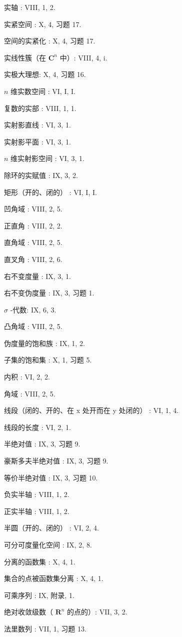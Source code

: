 实轴 : VIII, 1, 2.

实紧空间 : X, 4, 习题 17.

空间的实紧化 : X, 4, 习题 17.

实线性簇（在 \(\mathbf{C}^n\) 中）: VIII, 4, i.

实极大理想: X, 4, 习题 16.

\(n\) 维实数空间 : VI, I, I.

复数的实部 : VIII, 1, 1.

实射影直线 : VI, 3, 1.

实射影平面 : VI, 3, 1.

\(n\) 维实射影空间 : VI, 3, 1.

除环的实赋值 : IX, 3, 2.

矩形（开的、闭的） : VI, I, I.

凹角域 : VIII, 2, 5.

正直角 : VIII, 2, 2.

直角域 : VIII, 2, 5.

直叉角 : VIII, 2, 6.

右不变度量 : IX, 3, 1.

右不变伪度量 : IX, 3, 习题 1.

\(\sigma\) -代数: IX, 6, 3.

凸角域 : VIII, 2, 5.

伪度量的饱和族 : IX, 1, 2.

子集的饱和集 : X, 1, 习题 5.

内积 : VI, 2, 2.

角域 : VIII, 2, 5.

线段（闭的、开的、在 x 处开而在 y 处闭的） : VI, 1, 4.

线段的长度 : VI, 2, 1.

半绝对值 : IX, 3, 习题 9.

豪斯多夫半绝对值 : IX, 3, 习题 9.

等价半绝对值 : IX, 3, 习题 10.

负实半轴 : VIII, 1, 2.

正实半轴 : VIII, 1, 2.

半圆（开的、闭的） : VI, 2, 4.

可分可度量化空间 : IX, 2, 8.

分离的函数集 : X, 4, 1.

集合的点被函数集分离 : X, 4, 1.

可乘序列 : IX, 附录, 1.

绝对收敛级数（ \(\mathbf{R}^n\) 的点的）: VII, 3, 2.

法里数列 : VII, 1, 习题 13.

